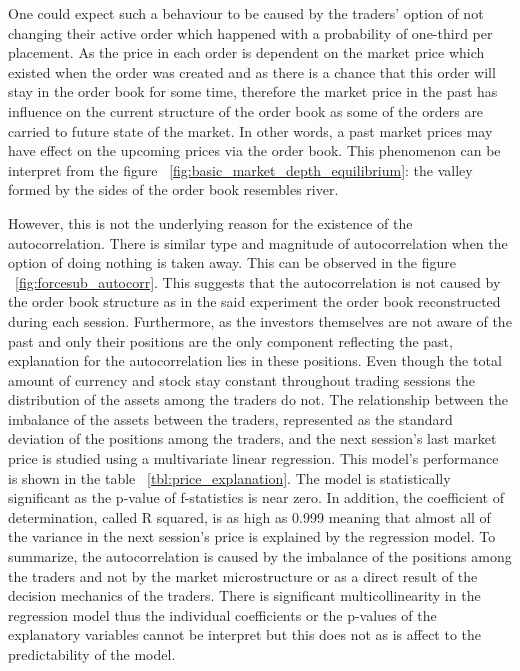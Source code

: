 One could expect such
a behaviour to be caused by the traders' option of not changing their active order which happened with a probability of
one-third per placement. As the price in each order
is dependent on the market price which existed when the order was created and as there is a chance that
this order will stay in the order book for some time, therefore the market price in the past has influence on the
current structure of the order book as some of the orders are carried to future state of the market. 
In other words, a past market prices may have effect on the upcoming prices via the order book.
This phenomenon can be interpret from the figure ~\ref{fig:basic_market_depth_equilibrium}: the valley
formed by the sides of the order book resembles river.

However, this is not the underlying reason for the existence of the autocorrelation. There is similar type and
magnitude of autocorrelation when the option of doing nothing is taken away. This can be observed in the figure 
~\ref{fig:forcesub_autocorr}. This suggests that the autocorrelation is not caused by the order book structure
as in the said experiment the order book reconstructed during each session. Furthermore, as the investors themselves are
not aware of the past and only their positions are the only component reflecting the past, explanation for the 
autocorrelation lies in these positions. Even though the total amount of currency and stock stay constant throughout
trading sessions the distribution of the assets among the traders do not. The relationship between the imbalance
of the assets between the traders, represented as the standard deviation of the positions among the traders, and
the next session's last market price is studied using a multivariate linear regression. This model's performance is
shown in the table ~\ref{tbl:price_explanation}. The model is statistically significant as the p-value of f-statistics
is near zero. In addition, the coefficient of determination, called R squared, is as high as 0.999 meaning that
almost all of the variance in the next session's price is explained by the regression model. To summarize, the
autocorrelation is caused by the imbalance of the positions among the traders and not by the market microstructure
or as a direct result of the decision mechanics of the traders. There is significant multicollinearity in the regression
model thus the individual coefficients or the p-values of the explanatory variables cannot be interpret but this 
does not as is affect to the predictability of the model. 


